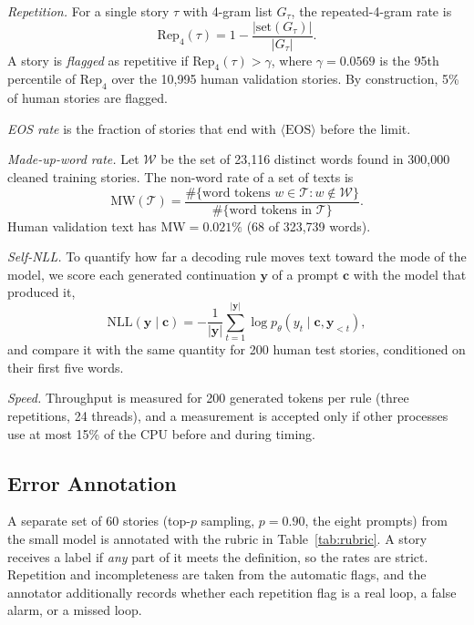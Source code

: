 \documentclass[journal]{IEEEtran}
\newcommand{\EOS}{\langle\mathrm{EOS}\rangle}
\begin{document}
\emph{Repetition.} For a single story $\tau$ with 4-gram list $G_\tau$, the repeated-4-gram rate is
\begin{equation}
\mathrm{Rep}_4(\tau) = 1-\frac{|\mathrm{set}(G_\tau)|}{|G_\tau|}.
\end{equation}
A story is \emph{flagged} as repetitive if $\mathrm{Rep}_4(\tau)>\gamma$, where $\gamma=0.0569$ is the 95th percentile of $\mathrm{Rep}_4$ over the 10,995 human validation stories. By construction, 5\% of human stories are flagged.

\emph{EOS rate} is the fraction of stories that end with $\EOS$ before the limit.

\emph{Made-up-word rate.} Let $\mathcal{W}$ be the set of 23,116 distinct words found in 300,000 cleaned training stories. The non-word rate of a set of texts is
\begin{equation}
\mathrm{MW}(\mathcal{T})=\frac{\#\{\text{word tokens } w\in\mathcal{T}: w\notin\mathcal{W}\}}{\#\{\text{word tokens in }\mathcal{T}\}}.
\end{equation}
Human validation text has $\mathrm{MW}=0.021\%$ (68 of 323,739 words).

\emph{Self-NLL.} To quantify how far a decoding rule moves text toward the mode of the model, we score each generated continuation $\mathbf{y}$ of a prompt $\mathbf{c}$ with the model that produced it,
\begin{equation}
\mathrm{NLL}(\mathbf{y}\mid\mathbf{c}) = -\frac{1}{|\mathbf{y}|}\sum_{t=1}^{|\mathbf{y}|}\log p_\theta(y_t\mid\mathbf{c},\mathbf{y}_{<t}),
\end{equation}
and compare it with the same quantity for 200 human test stories, conditioned on their first five words.

\emph{Speed.} Throughput is measured for 200 generated tokens per rule (three repetitions, 24 threads), and a measurement is accepted only if other processes use at most 15\% of the CPU before and during timing.

\subsection{Error Annotation}
A separate set of 60 stories (top-$p$ sampling, $p=0.90$, the eight prompts) from the small model is annotated with the rubric in Table~\ref{tab:rubric}. A story receives a label if \emph{any} part of it meets the definition, so the rates are strict. Repetition and incompleteness are taken from the automatic flags, and the annotator additionally records whether each repetition flag is a real loop, a false alarm, or a missed loop.
\end{document}
